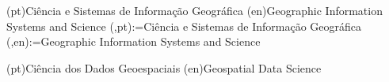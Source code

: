 \ntdegreename*(pt){Ciência e Sistemas de Informação Geográfica}
\ntdegreename*(en){Geographic Information Systems and Science}
\majorfield(\@DEGREEACR,pt):={Ciência e Sistemas de Informação Geográfica}
\majorfield(\@DEGREEACR,en):={Geographic Information Systems and Science}

\ntspecialization*(pt){Ciência dos Dados Geoespaciais}
\ntspecialization*(en){Geospatial Data Science}



